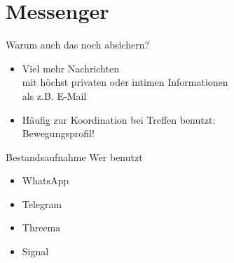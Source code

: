 \section{Messenger}
\begin{frame}{Warum auch das noch absichern?}
\begin{itemize}
\item Viel mehr Nachrichten\\ mit höchst privaten oder intimen Informationen\\ als z.B. E-Mail
\item Häufig zur Koordination bei Treffen benutzt:\\ Bewegungsprofil!
\end{itemize}

\pause
\begin{block}{Bestandsaufnahme}
Wer benutzt
\begin{itemize}
\item<+-> WhatsApp
\item<+-> Telegram
\item<+-> Threema
\item<+-> Signal
\end{itemize}
\end{block}
\end{frame}


